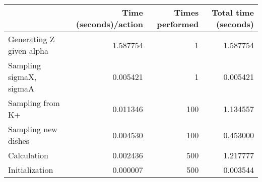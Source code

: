 \begin{tabular}{lrrr}
\toprule
{} &  Time (seconds)/action &  Times performed &  Total time (seconds) \\
\midrule
Generating Z given alpha &               1.587754 &                1 &              1.587754 \\
Sampling sigmaX, sigmaA  &               0.005421 &                1 &              0.005421 \\
Sampling from K+         &               0.011346 &              100 &              1.134557 \\
Sampling new dishes      &               0.004530 &              100 &              0.453000 \\
Calculation              &               0.002436 &              500 &              1.217777 \\
Initialization           &               0.000007 &              500 &              0.003544 \\
\bottomrule
\end{tabular}
